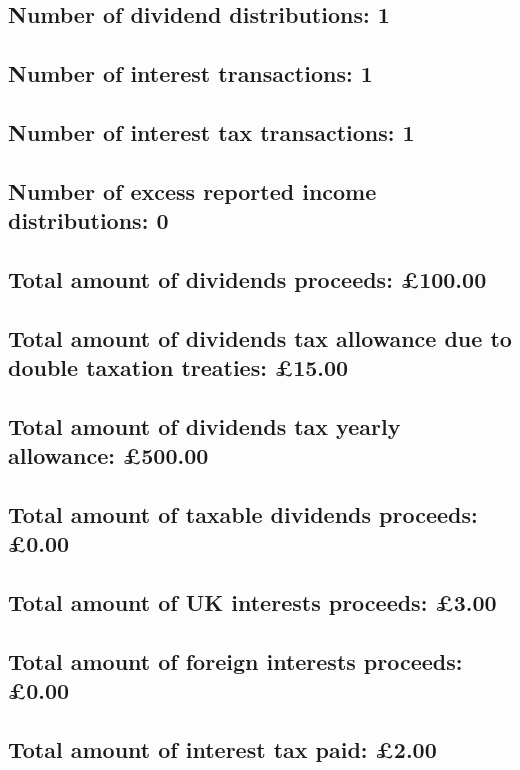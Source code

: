 \documentclass{article}
\begin{document}
\subsection*{Number of dividend distributions: 1}
\subsection*{Number of interest transactions: 1}
\subsection*{Number of interest tax transactions: 1}
\subsection*{Number of excess reported income distributions: 0}
\subsection*{Total amount of dividends proceeds: £100.00}
\subsection*{Total amount of dividends tax allowance due to double taxation treaties: £15.00}
\subsection*{Total amount of dividends tax yearly allowance: £500.00}
\subsection*{Total amount of taxable dividends proceeds: £0.00}
\subsection*{Total amount of UK interests proceeds: £3.00}
\subsection*{Total amount of foreign interests proceeds: £0.00}
\subsection*{Total amount of interest tax paid: £2.00}
\end{document}
